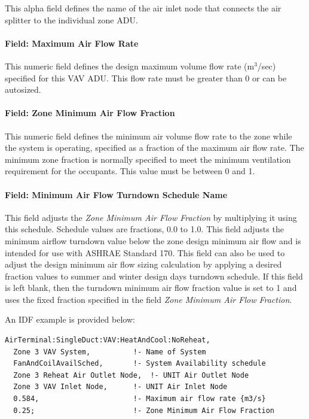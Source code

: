 This alpha field defines the name of the air inlet node that connects the air splitter to the individual zone ADU.

\paragraph{Field: Maximum Air Flow Rate}\label{field-maximum-air-flow-rate-5}

This numeric field defines the design maximum volume flow rate (m\(^{3}\)/sec) specified for this VAV ADU. This flow rate must be greater than 0 or can be autosized.

\paragraph{Field: Zone Minimum Air Flow Fraction}\label{field-zone-minimum-air-flow-fraction-2}

This numeric field defines the minimum air volume flow rate to the zone while the system is operating, specified as a fraction of the maximum air flow rate. The minimum zone fraction is normally specified to meet the minimum ventilation requirement for the occupants. This value must be between 0 and 1.

\paragraph{Field: Minimum Air Flow Turndown Schedule Name}

This field adjusts the \textit{Zone Minimum Air Flow Fraction} by multiplying it using this schedule. Schedule values are fractions, 0.0 to 1.0. This field adjusts the minimum airflow turndown value below the zone design minimum air flow and is intended for use with ASHRAE Standard 170. This field can also be used to adjust the design minimum air flow sizing calculation by applying a desired fraction values to summer and winter design days turndown schedule. If this field is left blank, then the turndown minimum air flow fraction value is set to 1 and uses the fixed fraction specified in the field \textit{Zone Minimum Air Flow Fraction}.

An IDF example is provided below:

\begin{lstlisting}
AirTerminal:SingleDuct:VAV:HeatAndCool:NoReheat,
  Zone 3 VAV System,          !- Name of System
  FanAndCoilAvailSched,       !- System Availability schedule
  Zone 3 Reheat Air Outlet Node,  !- UNIT Air Outlet Node
  Zone 3 VAV Inlet Node,      !- UNIT Air Inlet Node
  0.584,                      !- Maximum air flow rate {m3/s}
  0.25;                       !- Zone Minimum Air Flow Fraction
\end{lstlisting}


